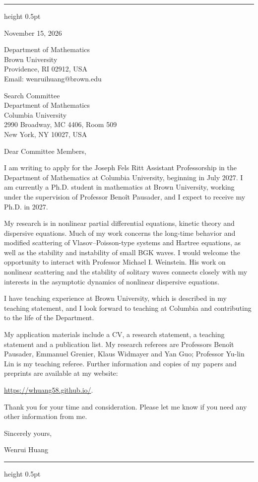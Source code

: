 \documentclass[10pt]{article}
\begin{document}
\vspace{0.08in}
\hrule height 0.5pt

\vspace{0.47in}
\hfill
\begin{minipage}{2.27in}
November 15, 2026

\vspace{0.16in}
Department of Mathematics\\
Brown University\\
Providence, RI 02912, USA\\
Email: wenrui\textunderscore huang@brown.edu
\end{minipage}

\vspace{0.30in}
Search Committee\\
Department of Mathematics\\
Columbia University\\
2990 Broadway, MC 4406, Room 509\\
New York, NY 10027, USA

\vspace{0.16in}
Dear Committee Members,

I am writing to apply for the Joseph Fels Ritt Assistant Professorship in the Department of Mathematics at Columbia University, beginning in July 2027. I am currently a Ph.D. student in mathematics at Brown University, working under the supervision of Professor Beno\^{i}t Pausader, and I expect to receive my Ph.D. in 2027.

My research is in nonlinear partial differential equations, kinetic theory and dispersive equations. Much of my work concerns the long-time behavior and modified scattering of Vlasov--Poisson-type systems and Hartree equations, as well as the stability and instability of small BGK waves. I would welcome the opportunity to interact with Professor Michael I. Weinstein. His work on nonlinear scattering and the stability of solitary waves connects closely with my interests in the asymptotic dynamics of nonlinear dispersive equations.

I have teaching experience at Brown University, which is described in my teaching statement, and I look forward to teaching at Columbia and contributing to the life of the Department.

My application materials include a CV, a research statement, a teaching statement and a publication list. My research referees are Professors Beno\^{i}t Pausader, Emmanuel Grenier, Klaus Widmayer and Yan Guo; Professor Yu-lin Lin is my teaching referee. Further information and copies of my papers and preprints are available at my website:

\url{https://whuang58.github.io/}.

\medskip
Thank you for your time and consideration. Please let me know if you need any other information from me.

\vspace{0.12in}
Sincerely yours,

\vspace{0.12in}
Wenrui Huang

\vfill
\hrule height 0.5pt
\end{document}
